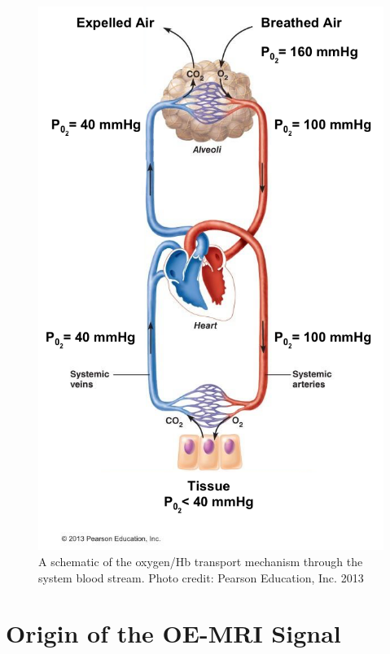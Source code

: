 	\begin{figure}
		\begin{center}
		\includegraphics[width=\textwidth]{./intro/intro-images/mmHg.png}
		\caption{A schematic of the oxygen/\acs{Hb} transport mechanism through the system blood stream. Photo credit: Pearson Education, Inc. 2013}
		\label{mmhg}
		\end{center}
	\end{figure}

\section{Origin of the OE-MRI Signal}


